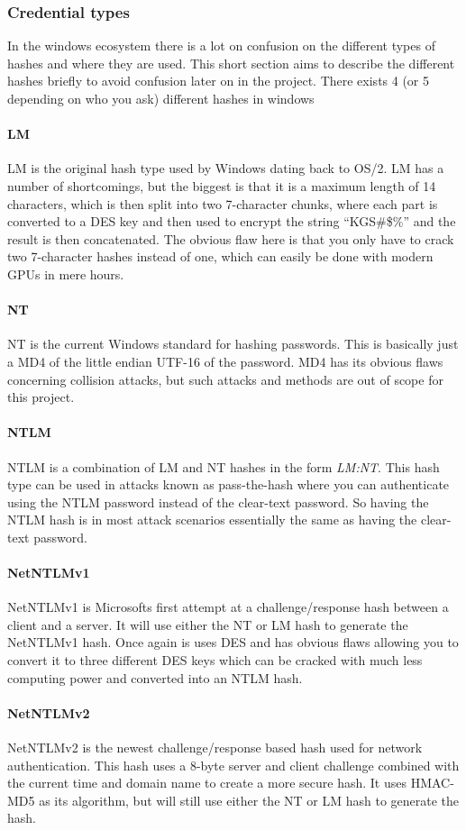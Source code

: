 \documentclass{article}
\begin{document}
\subsubsection{Credential types}
\label{sec:credential-types}
In the windows ecosystem there is a lot on confusion on the different types of hashes and where they are used. This short section aims to describe the different hashes briefly to avoid confusion later on in the project. There exists 4 (or 5 depending on who you ask) different hashes in windows\cite{url:hashes:hash-types}
\paragraph{LM}
LM is the original hash type used by Windows dating back to OS/2. LM has a number of shortcomings, but the biggest is that it is a maximum length of 14 characters, which is then split into two 7-character chunks, where each part is converted to a DES key and then used to encrypt the string ``KGS\!\@\#\$\%'' and the result is then concatenated. The obvious flaw here is that you only have to crack two 7-character hashes instead of one, which can easily be done with modern GPUs in mere hours.
\paragraph{NT}
NT is the current Windows standard for hashing passwords. This is basically just a MD4 of the little endian UTF-16 of the password. MD4 has its obvious flaws concerning collision attacks, but such attacks and methods are out of scope for this project.
\paragraph{NTLM}
NTLM is a combination of LM and NT hashes in the form \emph{LM:NT}. This hash type can be used in attacks known as pass-the-hash\cite{url:microsoft:pass-the-hash-mitigation} where you can authenticate using the NTLM password instead of the clear-text password. So having the NTLM hash is in most attack scenarios essentially the same as having the clear-text password.
\paragraph{NetNTLMv1}
NetNTLMv1 is Microsofts first attempt at a challenge/response hash between a client and a server. It will use either the NT or LM hash to generate the NetNTLMv1 hash. Once again is uses DES and has obvious flaws allowing you to convert it to three different DES keys which can be cracked with much less computing power and converted into an NTLM hash\cite{url:hashes:netntlmv1-to-ntlm}.
\paragraph{NetNTLMv2}
NetNTLMv2 is the newest challenge/response based hash used for network authentication. This hash uses a 8-byte server and client challenge combined with the current time and domain name to create a more secure hash. It uses HMAC-MD5 as its algorithm, but will still use either the NT or LM hash to generate the hash.

\end{document}
